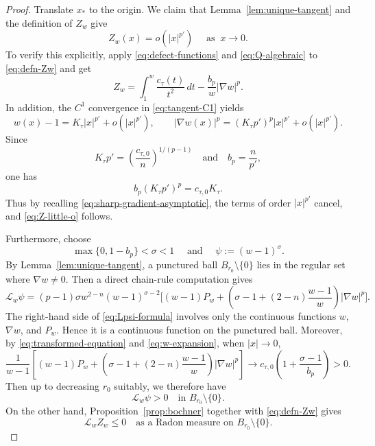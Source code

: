 \documentclass[reqno,12pt]{amsart}
\numberwithin{equation}{section}
\theoremstyle{remark}
\newcommand{\dd}{\,d}
\newcommand{\Lscr}{\mathscr L}
\begin{document}
\begin{proof}
Translate $x_*$ to the origin. We claim that Lemma~\ref{lem:unique-tangent} and the definition of $Z_w$ give
\begin{equation}\label{eq:Z-little-o}
Z_w(x)=o(|x|^{p'})
\quad \text{ as } \ x\to 0.
\end{equation}
To verify this explicitly, apply \eqref{eq:defect-functions} and \eqref{eq:Q-algebraic} to \eqref{eq:defn-Zw} and get
$$
 Z_w=\int_1^w\frac{c_\tau(t)}{t^2}\dd t -\frac{b_p}{w}|\nabla w|^p.
$$
In addition, the $C^1$ convergence in \eqref{eq:tangent-C1} yields
\begin{equation}\label{eq:w-expansion}
     w(x)-1=K_\tau|x|^{p'}+o(|x|^{p'}),
 \qquad  |\nabla w(x)|^p=(K_\tau p')^p|x|^{p'}+o(|x|^{p'}).
\end{equation}
Since
$$  K_\tau p' =  \left(\frac{c_{\tau,0}}n\right)^{1/(p-1)}
    \quad\text{and}\quad  b_p=\frac n{p'},
$$
one has
$$
b_p(K_\tau p')^p=c_{\tau,0}K_\tau.
$$
Thus by recalling \eqref{eq:sharp-gradient-asymptotic}, the terms of order $|x|^{p'}$ cancel, and \eqref{eq:Z-little-o} follows.

Furthermore, choose
\begin{equation}\label{eq:choose-sigma}
\max\{0,1-b_p\}<\sigma<1 \quad \text{ and }\quad \psi:=(w-1)^\sigma.
\end{equation}
By Lemma~\ref{lem:unique-tangent}, a punctured ball
$B_{r_0}\setminus\{0\}$ lies in the regular set where $\nabla w\neq 0$.  Then a direct chain-rule computation   gives
\begin{equation}\label{eq:Lpsi-formula}
 \Lscr_w\psi = (p-1)\sigma w^{2-n}(w-1)^{\sigma-2}\Bigg[
 (w-1)P_w +\left(\sigma-1+(2-n)\frac{w-1}{w}\right)|\nabla w|^p \Bigg].
\end{equation}
The right-hand side of \eqref{eq:Lpsi-formula} involves only the continuous functions $w$, $\nabla w$, and $P_w$.  Hence it is a continuous function on the punctured ball.  Moreover, by \eqref{eq:transformed-equation} and \eqref{eq:w-expansion}, when $|x|\to 0$,  
$$
 \frac 1 {w-1}\left[(w-1)P_w+ \left( \sigma-1+(2-n)\frac{w-1}{w} \right)|\nabla w|^p \right] \to c_{\tau,0} \left(1+\frac{\sigma-1}{b_p}\right)>0.
$$
Then up to decreasing $r_0$ suitably, we therefore have
\begin{equation}\label{eq:Lpsi-positive}
\Lscr_w\psi>0 \quad\text{in }B_{r_0}\setminus\{0\}.
\end{equation}
On the other hand, Proposition~\ref{prop:bochner} together with \eqref{eq:defn-Zw} gives
\begin{equation}\label{eq:LZ-negative}
\Lscr_wZ_w\le0 \quad\text{as a Radon measure on }B_{r_0}\setminus\{0\}.
\end{equation}


\end{proof}
\end{document}
